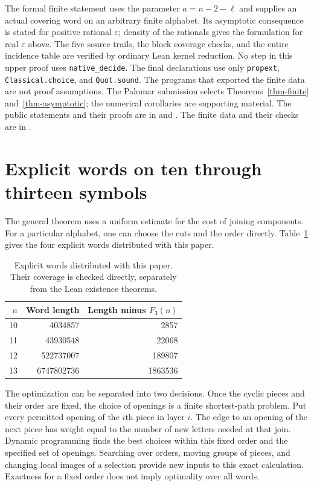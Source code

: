 \documentclass[11pt]{article}
\newcommand{\F}{F_3}
\begin{document}
The formal finite statement uses the parameter $a=n-2-\ell$ and supplies
an actual covering word on an arbitrary finite alphabet. Its asymptotic
consequence is stated for positive rational $\varepsilon$; density of the
rationals gives the formulation for real $\varepsilon$ above. The five
source trails, the block coverage checks, and the entire incidence table
are verified by ordinary Lean kernel reduction. No step in this upper
proof uses \texttt{native\_decide}. The final declarations use only
\texttt{propext}, \texttt{Classical.choice}, and \texttt{Quot.sound}.
The programs that exported the finite data are not proof assumptions.
The Palomar submission selects Theorems~\ref{thm-finite}
and~\ref{thm-asymptotic}; the numerical corollaries are supporting material.
The public statements and their proofs are in
 and
.
The finite data and their checks are in .

\section{Explicit words on ten through thirteen symbols}\label{sec-words}

The general theorem uses a uniform estimate for the cost of joining
components. For a particular alphabet, one can choose the cuts and the
order directly. Table~\ref{tab-words} gives the four explicit words
distributed with this paper.

\begin{table}[ht]
\centering
\begin{tabular}{rrr}
\toprule
$n$ & Word length & Length minus $\F(n)$\\
\midrule
10 & \num{4034857} & \num{2857}\\
11 & \num{43930548} & \num{22068}\\
12 & \num{522737007} & \num{189807}\\
13 & \num{6747802736} & \num{1863536}\\
\bottomrule
\end{tabular}
\caption{Explicit words distributed with this paper. Their coverage is
checked directly, separately from the Lean existence theorems.}
\label{tab-words}
\end{table}

The optimization can be separated into two decisions. Once the cyclic
pieces and their order are fixed, the choice of openings is a finite
shortest-path problem. Put every permitted opening of the $i$th piece
in layer $i$. The edge to an opening of the next piece has weight equal
to the number of new letters needed at that join. Dynamic programming
finds the best choices within this fixed order and the specified set of
openings. Searching over orders, moving groups of pieces, and changing
local images of a selection provide new inputs to this exact calculation.
Exactness for a fixed order does not imply optimality over all words.
\end{document}
